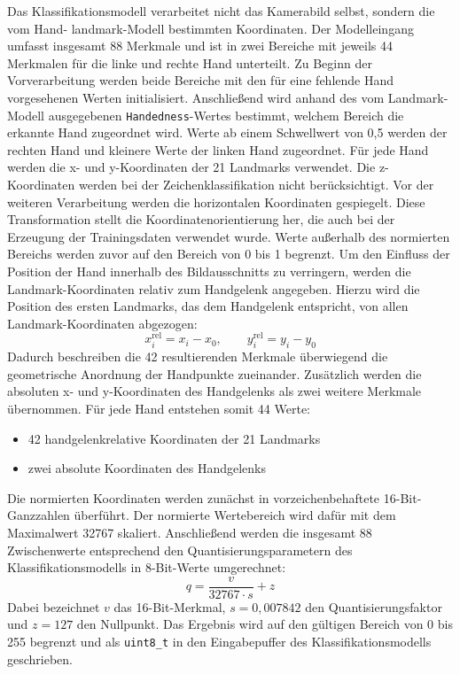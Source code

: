 Das Klassifikationsmodell verarbeitet nicht das Kamerabild selbst, sondern die vom Hand- landmark-Modell bestimmten Koordinaten. Der Modelleingang umfasst insgesamt 88 Merkmale und ist in zwei Bereiche mit jeweils 44 Merkmalen für die linke und rechte Hand unterteilt. Zu Beginn der Vorverarbeitung werden beide Bereiche mit den für eine fehlende Hand vorgesehenen Werten initialisiert. Anschließend wird anhand des vom Landmark-Modell ausgegebenen \texttt{Handedness}-Wertes bestimmt, welchem Bereich die erkannte Hand zugeordnet wird. Werte ab einem Schwellwert von 0,5 werden der rechten Hand und kleinere Werte der linken Hand zugeordnet. Für jede Hand werden die x- und y-Koordinaten der 21 Landmarks verwendet. Die z-Koordinaten werden bei der Zeichenklassifikation nicht berücksichtigt. Vor der weiteren Verarbeitung werden die horizontalen Koordinaten gespiegelt. Diese Transformation stellt die Koordinatenorientierung her, die auch bei der Erzeugung der Trainingsdaten verwendet wurde. Werte außerhalb des normierten Bereichs werden zuvor auf den Bereich von 0 bis 1 begrenzt. Um den Einfluss der Position der Hand innerhalb des Bildausschnitts zu verringern, werden die Landmark-Koordinaten relativ zum Handgelenk angegeben. Hierzu wird die Position des ersten Landmarks, das dem Handgelenk entspricht, von allen Landmark-Koordinaten abgezogen:
$$x_i^{\mathrm{rel}}=x_i-x_0,\qquad y_i^{\mathrm{rel}}=y_i-y_0$$
Dadurch beschreiben die 42 resultierenden Merkmale überwiegend die geometrische Anordnung der Handpunkte zueinander. Zusätzlich werden die absoluten x- und y-Koordinaten des Handgelenks als zwei weitere Merkmale übernommen. Für jede Hand entstehen somit 44 Werte:

\begin{itemize}
    \item 42 handgelenkrelative Koordinaten der 21 Landmarks
    \item zwei absolute Koordinaten des Handgelenks
\end{itemize}

Die normierten Koordinaten werden zunächst in vorzeichenbehaftete 16-Bit-Ganzzahlen überführt. Der normierte Wertebereich wird dafür mit dem Maximalwert 32767 skaliert. Anschließend werden die insgesamt 88 Zwischenwerte entsprechend den Quantisierungsparametern des Klassifikationsmodells in 8-Bit-Werte umgerechnet: 
$$
q
=
\frac{v}{32767 \cdot s}
+
z
$$
Dabei bezeichnet $v$  das 16-Bit-Merkmal, $s=0,007842$ den Quantisierungsfaktor und $z = 127$ den Nullpunkt. Das Ergebnis wird auf den gültigen Bereich von 0 bis 255 begrenzt und als \texttt{uint8\_t} in den Eingabepuffer des Klassifikationsmodells geschrieben.

